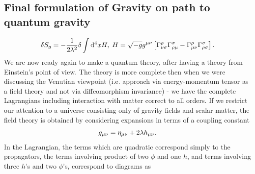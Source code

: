 \subsection{Final formulation of Gravity on path to quantum gravity}
\begin{equation}
	\delta S_g = - \frac{1}{2 \lambda^2} \delta \int \mathrm{d}^4x H, \; H= \sqrt{-g} g^{\mu \nu} \left[\Gamma^\rho_{\nu\sigma} \Gamma^\sigma_{\rho \mu} - \Gamma^\rho_{\mu \nu} \Gamma^\sigma_{\rho \sigma}\right].
\end{equation}
We are now ready again to make a quantum theory, after having a theory from Einstein's point of view. The theory is more complete then when we were discussing the Venutian viewpoint (i.e. approach via energy-momentum tensor as a field theory and not via diffeomorphism invariance) -  we have the complete Lagrangians including interaction with matter correct to all orders. If we restrict our attention to a universe consisting only of gravity fields and scalar matter, the field theory is obtained by considering expansions in terms of a coupling constant
\begin{equation}
	g_{\mu \nu}=\eta_{\mu \nu}+2\lambda h_{\mu \nu}.
\end{equation}
In the Lagrangian, the terms which are quadratic correspond simply to the propagators, the terms involving product of two $\phi$ and one $h$, and terms involving three $h$'s and two $\phi$'s, correspond to diagrams as

